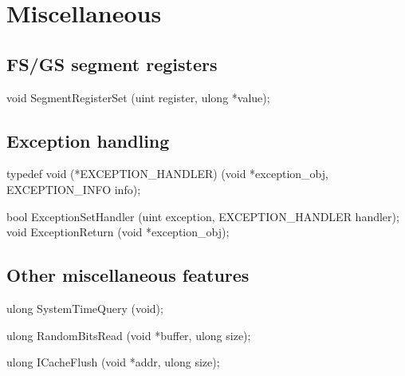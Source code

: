 \section{Miscellaneous}
\label{sec:abi:misc}




\subsection*{FS/GS segment registers}



\begin{paldef}
void SegmentRegisterSet (uint register, ulong *value);
\end{paldef}



\subsection*{Exception handling}



\begin{paldef}
typedef void (*EXCEPTION_HANDLER)
            (void *exception_obj, EXCEPTION_INFO info);
\end{paldef}



\begin{paldef}
bool ExceptionSetHandler  (uint exception,
                           EXCEPTION_HANDLER handler);
void ExceptionReturn      (void *exception_obj);
\end{paldef}




\subsection*{Other miscellaneous features}



\begin{paldef}
ulong SystemTimeQuery (void);
\end{paldef}


\begin{paldef}
ulong RandomBitsRead (void *buffer, ulong size);
\end{paldef}


\begin{paldef}
ulong ICacheFlush (void *addr, ulong size);
\end{paldef}
